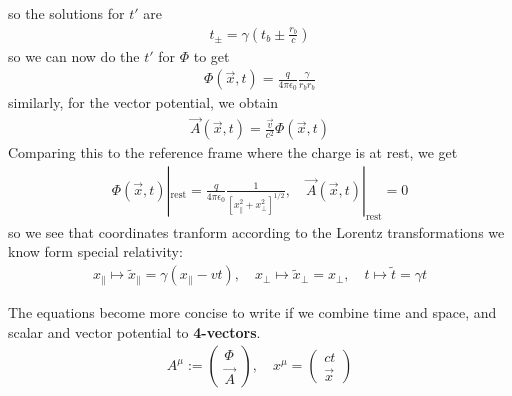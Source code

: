 so the solutions for $t'$ are
\begin{align*}
  t_{\pm} = \gamma \left(
    t_b \pm \frac{r_b}{c}
  \right)
\end{align*}
so we can now do the $t'$ for $\Phi$ to get
\begin{align*}
  \Phi(\vec{x},t) = \frac{q}{4 \pi \epsilon_0} \frac{\gamma}{r_br_b}
\end{align*}
similarly, for the vector potential, we obtain
\begin{align*}
  \vec{A}(\vec{x},t) = \frac{\vec{v}}{c^{2}} \Phi(\vec{x},t)
\end{align*}
Comparing this to the reference frame where the charge is at rest, we get
\begin{align*}
  \Phi(\vec{x},t)|_{\text{rest}} = \frac{q}{4 \pi \epsilon_0} \frac{1}{\left[x_{\parallel}^{2} + x_{\bot}^{2}\right]^{1/2}} , \quad \vec{A}(\vec{x},t)|_{\text{rest}} = 0
\end{align*}
so we see that coordinates tranform according to the Lorentz transformations we know form special relativity:
\begin{align*}
x_{\parallel} \mapsto \tilde{x}_{\parallel} = \gamma(x_{\parallel} - vt), \quad x_{\bot} \mapsto \tilde{x}_{\bot} = x_{\bot}, \quad t \mapsto \tilde{t} = \gamma t
\end{align*}

The equations become more concise to write if we combine time and space, and scalar and vector potential to \textbf{4-vectors}.
\begin{align*}
  A^{\mu}
  :=
  \begin{pmatrix}
  \Phi\\
  \vec{A}
  \end{pmatrix}, \quad
  x^{\mu} = \begin{pmatrix}
  ct\\
  \vec{x}
  \end{pmatrix}
\end{align*}


